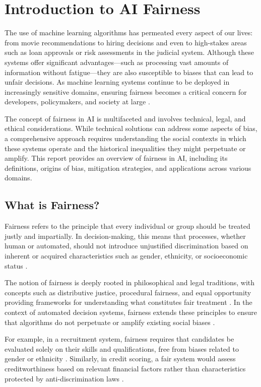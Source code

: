 \documentclass[12pt,a4paper,openright,twoside]{book}
\begin{document}
\section{Introduction to AI Fairness}
The use of machine learning algorithms has permeated every aspect of our lives: from movie recommendations to hiring decisions and even to high-stakes areas such as loan approvals or risk assessments in the judicial system. Although these systems offer significant advantages—such as processing vast amounts of information without fatigue—they are also susceptible to biases that can lead to unfair decisions. As machine learning systems continue to be deployed in increasingly sensitive domains, ensuring fairness becomes a critical concern for developers, policymakers, and society at large \cite{mehrabi2021survey}.

The concept of fairness in AI is multifaceted and involves technical, legal, and ethical considerations. While technical solutions can address some aspects of bias, a comprehensive approach requires understanding the social contexts in which these systems operate and the historical inequalities they might perpetuate or amplify. This report provides an overview of fairness in AI, including its definitions, origins of bias, mitigation strategies, and applications across various domains.

\subsection{What is Fairness?}
Fairness refers to the principle that every individual or group should be treated justly and impartially. In decision-making, this means that processes, whether human or automated, should not introduce unjustified discrimination based on inherent or acquired characteristics such as gender, ethnicity, or socioeconomic status \cite{smuha2021}.

The notion of fairness is deeply rooted in philosophical and legal traditions, with concepts such as distributive justice, procedural fairness, and equal opportunity providing frameworks for understanding what constitutes fair treatment \cite{kuppler2021distributivejusticefairnessmetrics}. In the context of automated decision systems, fairness extends these principles to ensure that algorithms do not perpetuate or amplify existing social biases \cite{algorithmBono2021}.

For example, in a recruitment system, fairness requires that candidates be evaluated solely on their skills and qualifications, free from biases related to gender or ethnicity \cite{Chen2023}. Similarly, in credit scoring, a fair system would assess creditworthiness based on relevant financial factors rather than characteristics protected by anti-discrimination laws \cite{algorithmicdiscrimination2024}.
\end{document}
